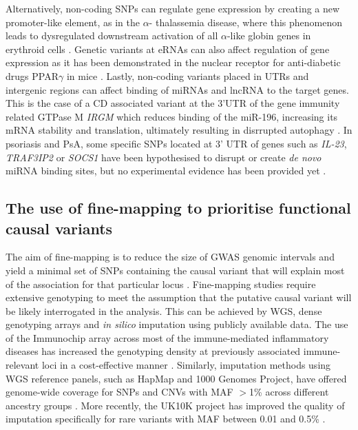 Alternatively, non-coding SNPs can regulate gene expression by creating a new promoter-like element, as in the $\alpha$- thalassemia disease, where this phenomenon leads to dysregulated downstream activation of all $\alpha$-like globin genes in erythroid cells \parencite{Gobbi2006}. Genetic variants at eRNAs can also affect regulation of gene expression as it has been demonstrated in the nuclear receptor for anti-diabetic drugs PPAR$\gamma$ in mice \parencite{Soccio2015}. Lastly, non-coding variants placed in UTRs and intergenic regions can affect binding of miRNAs and lncRNA to the target genes. This is the case of a CD associated variant at the 3'UTR of the gene immunity related GTPase M \textit{IRGM} which reduces binding of the miR-196, increasing its mRNA stability and translation, ultimately resulting in disrrupted autophagy  \parencite{Brest2011}. In psoriasis and PsA, some specific SNPs located at 3' UTR of genes such as \textit{IL-23}, \textit{TRAF3IP2} or \textit{SOCS1} have been hypothesised to disrupt or create \textit{de novo} miRNA binding sites, but no experimental evidence has been provided yet \parencite{Pivarcsi2014}. 

\subsection{The use of fine-mapping to prioritise functional causal variants}
The aim of fine-mapping is to reduce the size of GWAS genomic intervals and yield a minimal set of SNPs containing the causal variant that will explain most of the association for that particular locus \parencite{Spain2015}. Fine-mapping studies require extensive genotyping to meet the assumption that the putative causal variant will be likely interrogated in the analysis. This can be achieved by WGS, dense genotyping arrays and \textit{in silico} imputation using publicly available data. The use of the Immunochip array across most of the immune-mediated inflammatory diseases has increased the genotyping density at previously associated immune-relevant loci in a cost-effective manner \parencite{Trynka2011}. Similarly, imputation methods using WGS reference panels, such as HapMap and 1000 Genomes Project, have offered genome-wide coverage for SNPs and CNVs with MAF $>$1\% across different ancestry groups \parencite{Abecasis2012}. More recently, the UK10K project has improved the quality of imputation specifically for rare variants with MAF between 0.01 and 0.5\% \parencite{Chou2016}. 

